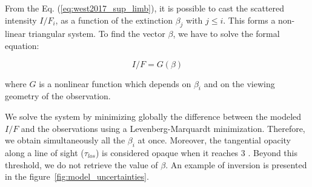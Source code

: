 From the Eq. (\ref{eq:west2017_sup_limb}), it is possible to cast the scattered intensity $I/F_i$, as a function of the extinction $\beta_j$ with $j \le i$. This forms a non-linear triangular system. To find the vector $\beta$, we have to solve the formal equation:

\begin{equation}
    I/F = G(\beta)
\end{equation}

where ${G}$ is a nonlinear function which depends on $\beta_i$ and on the viewing geometry of the observation.

We solve the system by minimizing globally the difference between the modeled $I/F$ and the observations
using a Levenberg-Marquardt minimization. Therefore, we obtain simultaneously all the $\beta_i$ at once.
Moreover, the tangential opacity along a line of sight ($\tau_{los}$) is considered opaque when it reaches 3 .
Beyond this threshold, we do not retrieve the value of $\beta$.
An example of inversion is presented in the figure~\ref{fig:model_uncertainties}.


